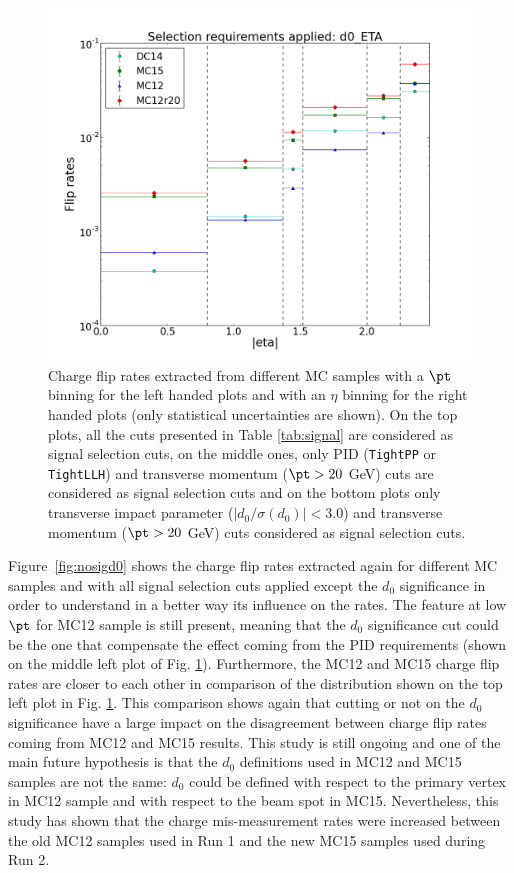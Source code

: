 \begin{figure}[!htbp]
\begin{center}
\includegraphics[width=0.4\linewidth]{FIGURES/BKG/chargeFlip/APPENDIX/fliprates_eta_d0_ETA.png}
\end{center}
\caption{\label{fig:all} Charge flip rates extracted from different MC samples with a $\pt$ binning for the left handed plots and with an $\eta$ binning for the right handed plots (only statistical uncertainties are shown). On the top plots, all the cuts presented in Table \ref{tab:signal} are considered as signal selection cuts, on the middle ones, only PID (\texttt{TightPP}  or \texttt{TightLLH}) and transverse momentum ($\pt>20$ GeV) cuts are considered as signal selection cuts and on the bottom plots only transverse impact parameter ($\left | d_0 / \sigma(d_0) \right |<3.0$) and transverse momentum ($\pt>20$ GeV) cuts considered as signal selection cuts.}
\end{figure}

Figure~\ref{fig:nosigd0} shows the charge flip rates extracted again for different MC samples and with all signal selection cuts applied except the $d_0$ significance in order to understand in a better way its influence on the rates. The feature at low $\pt$ for MC12 sample is still present, meaning that the $d_0$ significance cut could be the one that compensate the effect coming from the PID requirements (shown on the middle left plot of Fig. \ref{fig:all}). Furthermore, the MC12 and MC15 charge flip rates are closer to each other in comparison of the distribution shown on the top left plot in Fig. \ref{fig:all}. This comparison shows again that cutting or not on the $d_0$ significance have a large impact on the disagreement between charge flip rates coming from MC12 and MC15 results. This study is still ongoing and one of the main future hypothesis is that the $d_0$ definitions used in MC12 and MC15 samples are not the same: $d_0$ could be defined with respect to the primary vertex in MC12 sample and with respect to the beam spot in MC15. Nevertheless, this study has shown that the charge mis-measurement rates were increased between the old MC12 samples used in Run 1 and the new MC15 samples used during Run 2.

